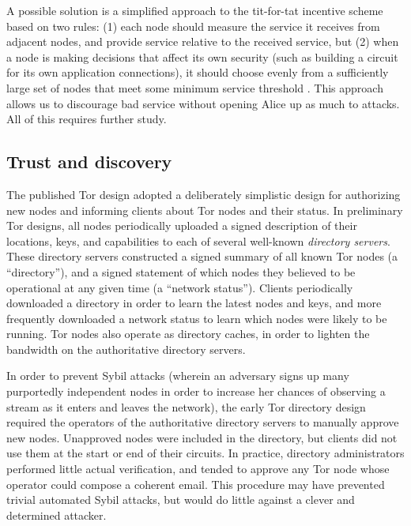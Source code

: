 \documentclass{llncs}
\begin{document}

A possible solution is a simplified approach to the tit-for-tat
incentive scheme based on two rules: (1) each node should measure the
service it receives from adjacent nodes, and provide service relative
to the received service, but (2) when a node is making decisions that
affect its own security (such as building a circuit for its own
application connections), it should choose evenly from a sufficiently
large set of nodes that meet some minimum service threshold
\cite{casc-rep}.  This approach allows us to discourage bad service
without opening Alice up as much to attacks.  All of this requires
further study.

\subsection{Trust and discovery}
\label{subsec:trust-and-discovery}

The published Tor design adopted a deliberately simplistic design for
authorizing new nodes and informing clients about Tor nodes and their status.
In preliminary Tor designs, all nodes periodically uploaded a
signed description
of their locations, keys, and capabilities to each of several well-known {\it
  directory servers}.  These directory servers constructed a signed summary
of all known Tor nodes (a ``directory''), and a signed statement of which
nodes they
believed to be operational at any given time (a ``network status'').  Clients
periodically downloaded a directory in order to learn the latest nodes and
keys, and more frequently downloaded a network status to learn which nodes were
likely to be running.  Tor nodes also operate as directory caches, in order to
lighten the bandwidth on the authoritative directory servers.

In order to prevent Sybil attacks (wherein an adversary signs up many
purportedly independent nodes in order to increase her chances of observing
a stream as it enters and leaves the network), the early Tor directory design
required the operators of the authoritative directory servers to manually
approve new nodes.  Unapproved nodes were included in the directory,
but clients
did not use them at the start or end of their circuits.  In practice,
directory administrators performed little actual verification, and tended to
approve any Tor node whose operator could compose a coherent email.
This procedure
may have prevented trivial automated Sybil attacks, but would do little
against a clever and determined attacker.
\end{document}
